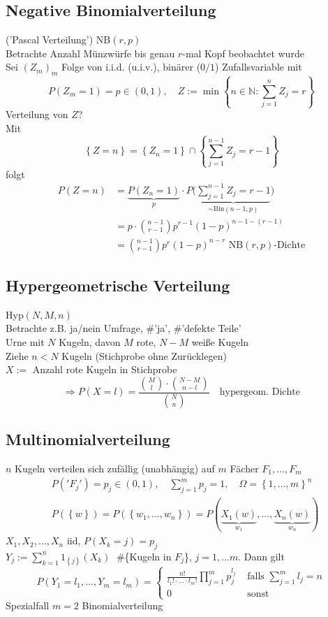 \documentclass[a4paper,openany]{book}
\theoremstyle{mytheoremstyle}
\theoremstyle{mytheoremstyle2}
\begin{document}
\subsection{Negative Binomialverteilung}
 ('Pascal Verteilung') NB$(r,p)$ \\
Betrachte Anzahl Münzwürfe bis genau $r$-mal Kopf beobachtet wurde \\
Sei $(Z_m)_m$ Folge von i.i.d. (u.i.v.), binärer ($0/1$) Zufallsvariable mit 
\[
  P(Z_m=1)=p \in (0,1), \quad Z:=\min \left\{n \in  \mathbb{N}:\sum_{j=1}^{n}{Z_j}=r\right\}
\]
Verteilung von $Z$? \\
Mit \[
  \left\{Z=n\right\}=\left\{Z_n=1\right\}\cap \left\{\sum_{j=1}^{n-1}{Z_j}=r-1\right\}
\]
folgt
\begin{align*}
  P(Z=n)&=\underbrace{P(Z_n=1)}_{p \text{}}\cdot P\bigg(\underbrace{\sum_{j=1}^{n-1}{Z_j}=r-1}_{\sim \text{Bin}(n-1,p) \text{}}\bigg)\\
        &= p \cdot \binom{n-1}{r-1}p^{r-1}(1-p)^{n-1-(r-1)}\\
        &=\binom{n-1}{r-1}p^r(1-p)^{n-r}\text{ \ NB$(r,p)$-Dichte}
\end{align*}
\subsection{Hypergeometrische Verteilung} Hyp$(N,M,n)$ \\
Betrachte z.B. ja/nein Umfrage, \#'ja', \#'defekte Teile' \\
Urne mit $N$ Kugeln, davon $M$ rote, $N-M$ weiße Kugeln \\
Ziehe $n<N$ Kugeln (Stichprobe ohne Zurücklegen) \\
$X:=$ Anzahl rote Kugeln in Stichprobe
\[
  \Rightarrow P(X=l)=\frac{\binom{M}{l}\cdot \binom{N-M}{n-l}}{\binom{N}{n}} \quad \text{hypergeom. Dichte}
\]
\subsection{Multinomialverteilung}
$n$ Kugeln verteilen sich zufällig (unabhängig) auf $m$ Fächer $F_1,...,F_m$  
\begin{align*}
  &P('F_j')=p_j \in (0,1), \quad \sum_{j=1}^{m}{p_j}=1,\quad \Omega =\left\{1,...,m\right\}^n\\
  &P(\left\{w\right\})=P(\left\{w_1,...,w_n\right\})=P(\underbrace{X_1(w)}_{w_1 \text{}},...,\underbrace{X_n(w)}_{w_n \text{}})
\end{align*}
$X_1,X_2,...,X_n $ iid, $P(X_k=j)=p_j$\\ 
$Y_j:=\sum\limits_{k=1}^{n}{1_{\left\{j\right\}}(X_k)}\;$ \#\{Kugeln in $F_j$\}, $j=1,...m$. Dann gilt 
\[
  P(Y_1=l_1,...,Y_m=l_m)=
  \begin{cases}
    \frac{n!}{l_1! \cdot ...\cdot l_m!}\prod\limits_{j=1}^{m}{p_j^{l_j}} & \text{ falls }\sum_{j=1}^{m}{l_j}=n\\
    0 & \text{ sonst}
  \end{cases}
\]
Spezialfall $m=2$ Binomialverteilung \\\\
\end{document}
